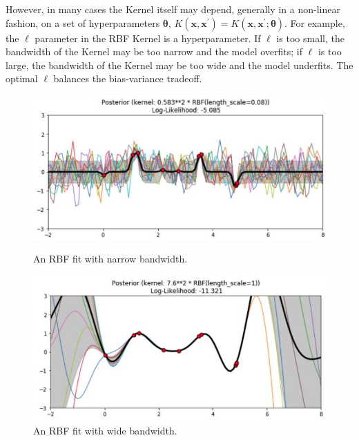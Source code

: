 \documentclass[11pt]{article}
\theoremstyle{plain} %
\theoremstyle{remark}
\begin{document}
However, in many cases the Kernel itself may depend, generally in a non-linear
fashion, on a set of hyperparameters $\boldsymbol{\theta}$, $K\left(\mathbf{x},
  \mathbf{x}^{\prime}\right)=K\left(\mathbf{x}, \mathbf{x}^{\prime};
  \boldsymbol{\theta}\right)$. For example, the $\ell$ parameter in the RBF Kernel is a
hyperparameter. If $\ell$ is too small, the bandwidth of the Kernel may be too narrow and the
model overfits; if $\ell$ is too large, the bandwidth of the Kernel may be too wide and the
model underfits. The optimal $\ell$ balances the bias-variance tradeoff.

\begin{figure}[!htp]
  \begin{minipage}{0.33\textwidth}
    \centering
    \includegraphics[width=\textwidth]{images/2023_11_26_5b299dbd302e8f129737g-60}
    \caption{An RBF fit with narrow bandwidth.}
    \label{fig:RBF Kernel narrow bandwidth}
  \end{minipage}
  \begin{minipage}{0.33\textwidth}
    \centering
    \includegraphics[width=\textwidth]{images/2023_11_26_5b299dbd302e8f129737g-61}
    \caption{An RBF fit with wide bandwidth.}
    \label{fig:RBF Kernel wide bandwidth}
  \end{minipage}
  \begin{minipage}{0.33\textwidth}

\end{minipage}
\end{figure}
\end{document}
